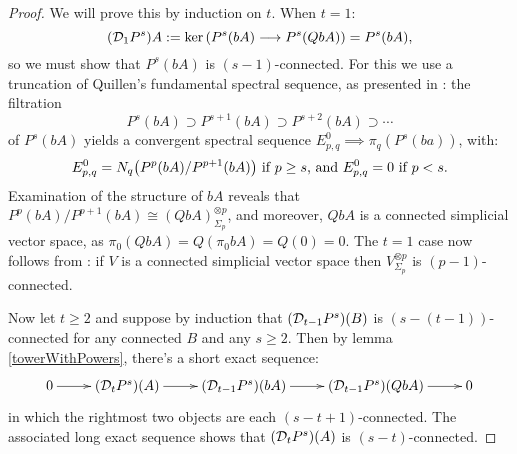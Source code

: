 \documentclass[11pt]{amsart}
\theoremstyle{plain}
\newcommand{\caldup}[1]{\calD_{\smash{#1}}}
\begin{document}
\begin{proof}
We will prove this by induction on $t$. When $t=1$:
\[(\caldup{1}P^{s})A:=\ker(P^{s}(bA)\to P^{s}(QbA))=P^{s}(bA),\]
so we must show that $P^s(bA)$ is $(s-1)$-connected. For this we use a truncation of Quillen's fundamental spectral sequence, as presented in \cite[Thm 6.2]{MR1089001}: the filtration
\[P^s(bA)\supset P^{s+1}(bA)\supset P^{s+2}(bA)\supset\cdots \]
of $P^s(bA)$ yields a convergent spectral sequence  $E^0_{p,q}\implies \pi_q(P^s(ba))$, with:
\[E^0_{p,q}=N_q\bigl(P^{p}(bA)/P^{p+1}(bA)\bigr)\textup{ if $p\geq s$, and }E^0_{p,q}=0\textup{ if $p<s$.}\]
Examination of the structure of $bA$ reveals that $P^{p}(bA)/P^{p+1}(bA)\cong (QbA)^{\otimes p}_{\Sigma_p}$, and moreover, $QbA$ is a connected simplicial vector space, as $\pi_0(QbA)=Q(\pi_0bA)=Q(0)=0$. The $t=1$ case now follows from \cite[Satz 12.1]{DoldPuppeSuspension.pdf}: if $V$ is a connected simplicial vector space then $V^{\otimes p}_{\Sigma_p}$ is $(p-1)$-connected. 

%
%

Now let $t\geq2$ and suppose by induction that $(\caldup{t-1}P^{s})(B)$ is $(s-(t-1))$-connected for any connected $B$ and any $s\geq2$. Then by lemma \ref{towerWithPowers}, there's a short exact sequence:
\[\xymatrix{
0\ar[r]&
(\caldup{t}P^{s})(A)\ar[r]&
(\caldup{t-1}P^{s})(bA)\ar[r]&
(\caldup{t-1}P^{s})(QbA)\ar[r]&
0
}\]
in which the rightmost two objects are each $(s-t+1)$-connected. The associated long exact sequence shows that $(\caldup{t}P^{s})(A)$ is $(s-t)$-connected.
\end{proof}
\end{document}
